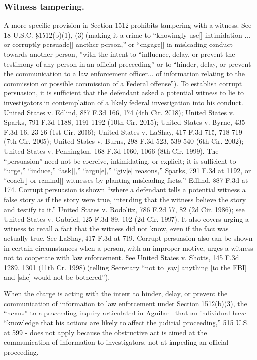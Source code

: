 \subsubsection*{Witness tampering.}
A more specific provision in Section 1512 prohibits tampering with a witness.
See 18 U.S.C. \S 1512(b)(1), (3) (making it a crime to “knowingly use[] intimidation ... or corruptly persuade[] another person,” or “engage[] in misleading conduct towards another person, ”with the intent to “influence, delay, or prevent the testimony of any person in an official proceeding” or to “hinder, delay, or prevent the communication to a law enforcement officer... of information relating to the commission or possible commission of a Federal offense”).
To establish corrupt persuasion, it is sufficient that the defendant asked a potential witness to lie to investigators in contemplation of a likely federal investigation into his conduct.
United States v. Edlind, 887 F.3d 166, 174 (4th Cir. 2018);
United States v. Sparks, 791 F.3d 1188, 1191-1192 (10th Cir. 2015);
United States v. Byrne, 435 F.3d 16, 23-26 (1st Cir. 2006);
United States v. LaShay, 417 F.3d 715, 718-719 (7th Cir. 2005);
United States v. Burns, 298 F.3d 523, 539-540 (6th Cir. 2002);
United States v. Pennington, 168 F.3d 1060, 1066 (8th Cir. 1999).
The “persuasion” need not be coercive, intimidating, or explicit;
it is sufficient to “urge,” “induce,” “ask[],” “argu[e],” “giv[e] reasons,” Sparks, 791 F.3d at 1192, or “coach[] or remind[] witnesses by planting misleading facts,” Edlind, 887 F.3d at 174.
Corrupt persuasion is shown “where a defendant tells a potential witness a false story as if the story were true, intending that the witness believe the story and testify to it.”
United States v. Rodolitz, 786 F.2d 77, 82 (2d Cir. 1986);
see United States v. Gabriel, 125 F.3d 89, 102 (2d Cir. 1997).
It also covers urging a witness to recall a fact that the witness did not know, even if the fact was actually true.
See LaShay, 417 F.3d at 719.
Corrupt persuasion also can be shown in certain circumstances when a person, with an improper motive, urges a witness not to cooperate with law enforcement.
See United States v. Shotts, 145 F.3d 1289, 1301 (11th Cr. 1998) (telling Secretary “not to [say] anything [to the FBI] and [she] would not be bothered”).

When the charge is acting with the intent to hinder, delay, or prevent the communication of information to law enforcement under Section 1512(b)(3), the “nexus” to a proceeding inquiry articulated in Aguilar - that an individual have “knowledge that his actions are likely to affect the judicial proceeding,” 515 U.S. at 599 - does not apply because the obstructive act is aimed at the communication of information to investigators, not at impeding an official proceeding.

